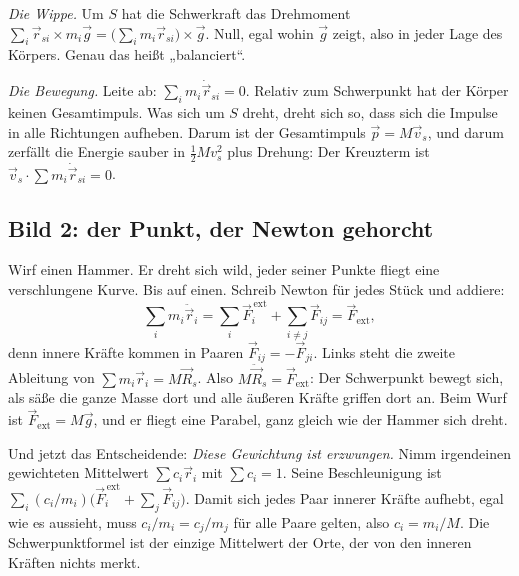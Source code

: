 \documentclass[deutsch]{kaelearn}
\newcommand\ext{_{\mathrm{ext}}}
\begin{document}
\emph{Die Wippe.} Um $S$ hat die Schwerkraft das Drehmoment $\sum_i\vec r_{si}\times m_i\vec g = \big(\sum_i m_i\vec r_{si}\big)\times\vec g$.
Null, egal wohin $\vec g$ zeigt, also in jeder Lage des Körpers. Genau das heißt „balanciert“.

\emph{Die Bewegung.} Leite ab: $\sum_i m_i\dot{\vec r}_{si} = 0$. Relativ zum Schwerpunkt hat der Körper keinen Gesamtimpuls. Was sich um $S$
dreht, dreht sich so, dass sich die Impulse in alle Richtungen aufheben. Darum ist der Gesamtimpuls $\vec p = M\vec v_s$, und darum zerfällt
die Energie sauber in $\frac12Mv_s^2$ plus Drehung: Der Kreuzterm ist $\vec v_s\cdot\sum m_i\dot{\vec r}_{si} = 0$.



\subsection{Bild 2: der Punkt, der Newton gehorcht}
Wirf einen Hammer. Er dreht sich wild, jeder seiner Punkte fliegt eine verschlungene Kurve. Bis auf einen. Schreib Newton für jedes Stück
und addiere:
\[
  \sum_i m_i\ddot{\vec r}_i = \sum_i\vec F_i^{\,\mathrm{ext}} + \sum_{i\ne j}\vec F_{ij} = \vec F\ext ,
\]
denn innere Kräfte kommen in Paaren $\vec F_{ij} = -\vec F_{ji}$. Links steht die zweite Ableitung von $\sum m_i\vec r_i = M\vec R_s$. Also
$M\ddot{\vec R}_s = \vec F\ext$: Der Schwerpunkt bewegt sich, als säße die ganze Masse dort und alle äußeren Kräfte griffen dort an.
Beim Wurf ist $\vec F\ext = M\vec g$, und er fliegt eine Parabel, ganz gleich wie der Hammer sich dreht.

Und jetzt das Entscheidende: \emph{Diese Gewichtung ist erzwungen.} Nimm irgendeinen gewichteten Mittelwert $\sum c_i\vec r_i$ mit
$\sum c_i = 1$. Seine Beschleunigung ist $\sum_i(c_i/m_i)\big(\vec F_i^{\,\mathrm{ext}}+\sum_j\vec F_{ij}\big)$. Damit sich jedes Paar
innerer Kräfte aufhebt, egal wie es aussieht, muss $c_i/m_i = c_j/m_j$ für alle Paare gelten, also $c_i = m_i/M$. Die Schwerpunktformel ist
der einzige Mittelwert der Orte, der von den inneren Kräften nichts merkt.
\end{document}
